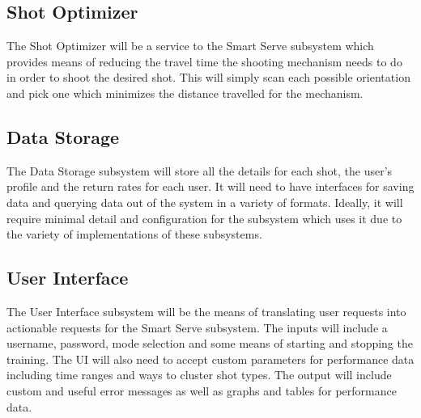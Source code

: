 \documentclass[11pt]{article}
\begin{document}
\subsection{Shot Optimizer}
The Shot Optimizer will be a service to the Smart Serve subsystem which provides means of reducing the travel time the shooting mechanism needs to do in order to shoot the desired shot. This will simply scan each possible orientation and pick one which minimizes the distance travelled for the mechanism.
\subsection{Data Storage}
The Data Storage subsystem will store all the details for each shot, the user's profile and the return rates for each user. It will need to have interfaces for saving data and querying data out of the system in a variety of formats. Ideally, it will require minimal detail and configuration for the subsystem which uses it due to the variety of implementations of these subsystems.
\subsection{User Interface}
The User Interface subsystem will be the means of translating user requests into actionable requests for the Smart Serve subsystem. The inputs will include a username, password, mode selection and some means of starting and stopping the training. The UI will also need to accept custom parameters for performance data including time ranges and ways to cluster shot types. The output will include custom and useful error messages as well as graphs and tables for performance data.
\end{document}
